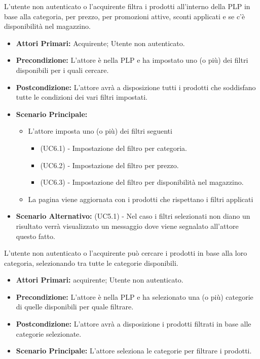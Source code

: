 L'utente non autenticato o l'acquirente filtra i prodotti all'interno della PLP in base alla categoria, per prezzo, per promozioni attive, sconti applicati e se c'è disponibilità nel magazzino.
\begin{itemize}
    \item \textbf{Attori Primari:} Acquirente; Utente non autenticato.
    \item \textbf{Precondizione:} L'attore è nella PLP e ha impostato uno (o più) dei filtri disponibili per i quali cercare.
    \item \textbf{Postcondizione:} L'attore avrà a disposizione tutti i prodotti che soddisfano tutte le condizioni dei vari filtri impostati.
    \item \textbf{Scenario Principale:}
    \begin{itemize}
        \item L'attore imposta uno (o più) dei filtri seguenti 
        \begin{itemize}
            \item (UC6.1) - Impostazione del filtro per categoria.
            \item (UC6.2) - Impostazione del filtro per prezzo.
            \item (UC6.3) - Impostazione del filtro per disponibilità nel magazzino.
        \end{itemize}
        \item La pagina viene aggiornata con i prodotti che rispettano i filtri applicati
    \end{itemize}
    \item \textbf{Scenario Alternativo:} (UC5.1) - Nel caso i filtri selezionati non diano un risultato verrà visualizzato un messaggio dove viene segnalato all'attore questo fatto.
\end{itemize}

\resetSubUC

L'utente non autenticato o l'acquirente può cercare i prodotti in base alla loro categoria, selezionando tra tutte le categorie disponibili.
\begin{itemize}
    \item \textbf{Attori Primari:} acquirente; Utente non autenticato.
    \item \textbf{Precondizione:} L'attore è nella PLP e ha selezionato una (o più) categorie di quelle disponibili per quale filtrare.
    \item \textbf{Postcondizione:} L'attore avrà a disposizione i prodotti filtrati in base alle categorie selezionate.
    \item \textbf{Scenario Principale:} L'attore seleziona le categorie per filtrare i prodotti.
\end{itemize}

